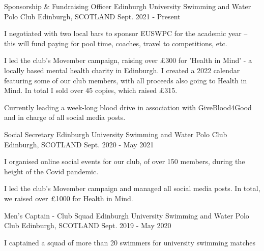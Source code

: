 \begin{cventries}
  \cventry
    {Sponsorship \& Fundraising Officer} %
    {Edinburgh University Swimming and Water Polo Club} %
    {Edinburgh, SCOTLAND} %
    {Sept. 2021 - Present} %
    {
      \begin{cvitems} %
        \item I negotiated with two local bars to sponsor EUSWPC for the academic year -- this will fund paying for pool time, coaches, travel to competitions, etc.
        \item I led the club's Movember campaign, raising over £300 for 'Health in Mind' - a locally based mental health charity in Edinburgh. I created a 2022 calendar featuring some of our club members, with all proceeds also going to Health in Mind. In total I sold over 45 copies, which raised £315.
        \item Currently leading a week-long blood drive in association with GiveBlood4Good and in charge of all social media posts.
      \end{cvitems}
    }
    
  \cventry
    {Social Secretary} %
    {Edinburgh University Swimming and Water Polo Club} %
    {Edinburgh, SCOTLAND} %
    {Sept. 2020 - May 2021} %
    {
      \begin{cvitems} %
        \item I organised online social events for our club, of over 150 members, during the height of the Covid pandemic.
        \item I led the club's Movember campaign and managed all social media posts. In total, we raised over £1000 for Health in Mind.
      \end{cvitems}
    }
    
  \cventry
    {Men's Captain - Club Squad} %
    {Edinburgh University Swimming and Water Polo Club} %
    {Edinburgh, SCOTLAND} %
    {Sept. 2019 - May 2020} %
    {
      \begin{cvitems} %
        \item I captained a squad of more than 20 swimmers for university swimming matches
      \end{cvitems}
    }
\end{cventries}

